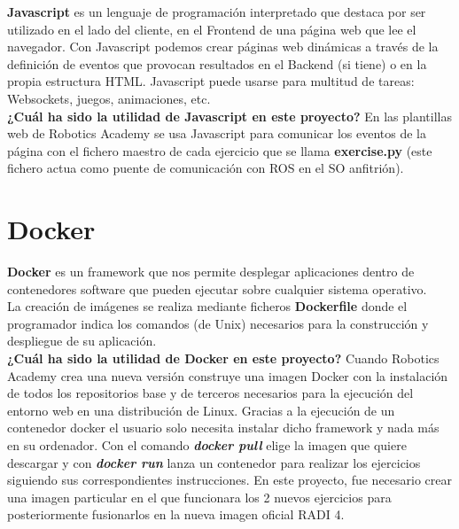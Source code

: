 \textbf{Javascript} es un lenguaje de programación interpretado que destaca por ser utilizado en el lado del cliente, en el Frontend de una página web que lee el navegador. Con Javascript podemos crear páginas web dinámicas a través de la definición de eventos que provocan resultados en el Backend (si tiene) o en la propia estructura HTML. Javascript puede usarse para multitud de tareas: Websockets, juegos, animaciones, etc.\\

\textbf{¿Cuál ha sido la utilidad de Javascript en este proyecto?}
En las plantillas web de Robotics Academy se usa Javascript para comunicar los eventos de la página con el fichero maestro de cada ejercicio que se llama \textbf{exercise.py} (este fichero actua como puente de comunicación con ROS en el SO anfitrión).\\




\section{Docker}
\label{sec:docker}

\textbf{Docker} es un framework que nos permite desplegar aplicaciones dentro de contenedores software que pueden ejecutar sobre cualquier sistema operativo.\\

La creación de imágenes se realiza mediante ficheros \textbf{Dockerfile} donde el programador indica los comandos (de Unix) necesarios para la construcción y despliegue de su aplicación.\\

\textbf{¿Cuál ha sido la utilidad de Docker en este proyecto?} Cuando Robotics Academy crea una nueva versión construye una imagen Docker con la instalación de todos los repositorios base y de terceros necesarios para la ejecución del entorno web en una distribución de Linux. Gracias a la ejecución de un contenedor docker el usuario solo necesita instalar dicho framework y nada más en su ordenador. Con el comando \textbf{\textit{docker pull}} elige la imagen que quiere descargar y con \textbf{\textit{docker run}} lanza un contenedor para realizar los ejercicios siguiendo sus correspondientes instrucciones. En este proyecto, fue necesario crear una imagen particular en el que funcionara los 2 nuevos ejercicios para posteriormente fusionarlos en la nueva imagen oficial RADI 4.\\




